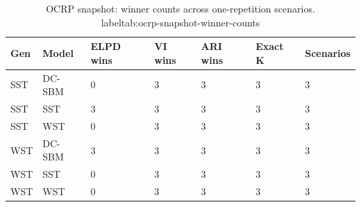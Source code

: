 \begin{table}[!h]
\centering
\caption{OCRP snapshot: winner counts across one-repetition scenarios.\\label{tab:ocrp-snapshot-winner-counts}}
\centering
\begin{tabular}[t]{lllllll}
\toprule
Gen & Model & ELPD wins & VI wins & ARI wins & Exact K & Scenarios\\
\midrule
SST & DC-SBM & 0 & 3 & 3 & 3 & 3\\
SST & SST & 3 & 3 & 3 & 3 & 3\\
SST & WST & 0 & 3 & 3 & 3 & 3\\
WST & DC-SBM & 3 & 3 & 3 & 3 & 3\\
WST & SST & 0 & 3 & 3 & 3 & 3\\
WST & WST & 0 & 3 & 3 & 3 & 3\\
\bottomrule
\end{tabular}
\end{table}
